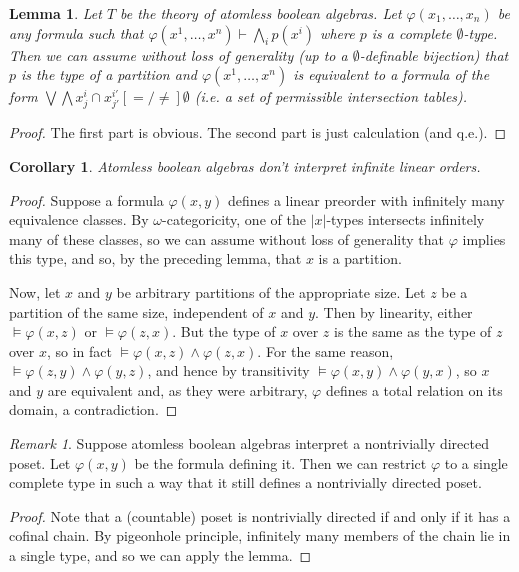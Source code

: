 \documentclass[final,a4paper,12pt]{amsart}
\newcommand{\bigland}{\bigwedge}
\newcommand{\biglor}{\bigvee}
\newcommand{\proves}{\vdash}
\newtheorem{lem}[thm]{Lemma}
\newtheorem{cor}[thm]{Corollary}
\theoremstyle{remark}
\newtheorem{rem}[thm]{Remark}
\theoremstyle{definition}
\begin{document}
	\begin{lem}
		Let $T$ be the theory of atomless boolean algebras. Let $\varphi(x_1,\ldots,x_n)$ be any formula such that $\varphi(x^1,\ldots,x^n)\proves \bigland_i p(x^i)$ where $p$ is a complete $\emptyset$-type. Then we can assume without loss of generality (up to a $\emptyset$-definable bijection) that $p$ is the type of a partition and $\varphi(x^1,\ldots,x^n)$ is equivalent to a formula of the form $\biglor\bigland x_j^i\cap x_{j'}^{i'}\mathrel{[{=}/{\neq}]}\emptyset$ (i.e. a set of \emph{permissible} intersection tables).
	\end{lem}
	\begin{proof}
		The first part is obvious. The second part is just calculation (and q.e.).
	\end{proof}
	
	\begin{cor}
		Atomless boolean algebras don't interpret infinite linear orders.
	\end{cor}
	\begin{proof}
		Suppose a formula $\varphi(x,y)$ defines a linear preorder with infinitely many equivalence classes. By $\omega$-categoricity, one of the $\lvert x\rvert$-types intersects infinitely many of these classes, so we can assume without loss of generality that $\varphi$ implies this type, and so, by the preceding lemma, that $x$ is a partition.
		
		Now, let $x$ and $y$ be arbitrary partitions of the appropriate size. Let $z$ be a partition of the same size, independent of $x$ and $y$. Then by linearity, either $\models \varphi(x,z)$ or $\models \varphi(z,x)$. But the type of $x$ over $z$ is the same as the type of $z$ over $x$, so in fact $\models\varphi(x,z)\land \varphi(z,x)$. For the same reason, $\models \varphi(z,y)\land \varphi(y,z)$, and hence by transitivity $\models \varphi(x,y)\land \varphi(y,x)$, so $x$ and $y$ are equivalent and, as they were arbitrary, $\varphi$ defines a total relation on its domain, a contradiction.
	\end{proof}
	
	\begin{rem}
		Suppose atomless boolean algebras interpret a nontrivially directed poset. Let $\varphi(x,y)$ be the formula defining it. Then we can restrict $\varphi$ to a single complete type in such a way that it still defines a nontrivially directed poset.
	\end{rem}
	\begin{proof}
		Note that a (countable) poset is nontrivially directed if and only if it has a cofinal chain. By pigeonhole principle, infinitely many members of the chain lie in a single type, and so we can apply the lemma. 
	\end{proof}
	
\end{document}

